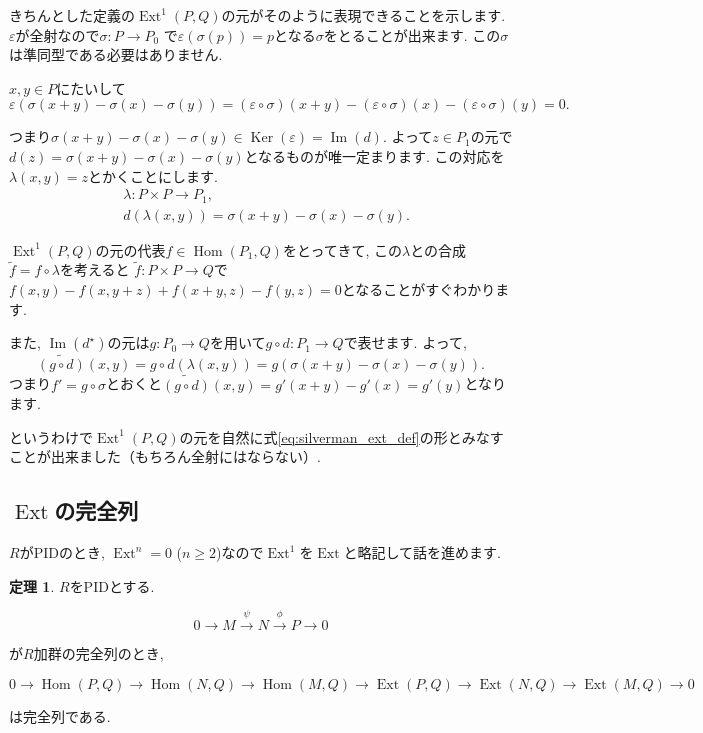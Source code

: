 \documentclass{jsarticle}
\newcommand{\makeop}[1]{\mathop{\mathrm{#1}}\nolimits}
\def\Im{\makeop{Im}}
\def\Ker{\makeop{Ker}}
\def\Hom{\makeop{Hom}}
\def\Ext{\makeop{Ext}}
\theoremstyle{definition}
\newtheorem{theorem}{定理}
\numberwithin{theorem}{section}
\begin{document}
きちんとした定義の$\Ext^1(P, Q)$の元がそのように表現できることを示します. $\varepsilon$が全射なので$\sigma : P \rightarrow P_0$
で$\varepsilon(\sigma(p)) = p$となる$\sigma$をとることが出来ます. この$\sigma$は準同型である必要はありません.

$x, y \in P$にたいして
\[
\varepsilon(\sigma(x+y) - \sigma(x) - \sigma(y)) = (\varepsilon\circ\sigma)(x+y) - (\varepsilon\circ\sigma)(x) - (\varepsilon\circ\sigma)(y) = 0.
\]

つまり$\sigma(x+y) - \sigma(x) - \sigma(y) \in \Ker(\varepsilon) = \Im(d)$. よって$z\in P_1$の元で
$d(z) = \sigma(x+y) - \sigma(x) - \sigma(y)$となるものが唯一定まります. この対応を$\lambda(x, y) = z$とかくことにします.
\begin{align*}
& \lambda: P\times P \rightarrow P_1,\\
& d(\lambda(x, y)) = \sigma(x+y) - \sigma(x) - \sigma(y).
\end{align*}

$\Ext^1(P, Q)$の元の代表$f\in\Hom(P_1, Q)$をとってきて, この$\lambda$との合成$\tilde{f} = f\circ\lambda$を考えると
$\tilde{f} : P \times P \rightarrow Q$で$f(x, y) - f(x, y+z) + f(x+y, z) - f(y, z) = 0$となることがすぐわかります.

また, $\Im(d^\star)$の元は$g: P_0 \rightarrow Q$を用いて$g\circ d: P_1 \rightarrow Q$で表せます. よって,
\[
\widetilde{(g\circ d)} (x, y) = g\circ d(\lambda(x, y)) = g(\sigma(x+y) - \sigma(x) - \sigma(y)).
\]
つまり$f' = g\circ\sigma$とおくと$\widetilde{(g\circ d)}(x, y) = g'(x+y) - g'(x) = g'(y)$となります.

というわけで$\Ext^1(P, Q)$の元を自然に式\ref{eq:silverman_ext_def}の形とみなすことが出来ました（もちろん全射にはならない）.

\subsection{$\Ext$の完全列}
$R$がPIDのとき, $\Ext^n = 0$ ($n \geq 2$)なので$\Ext^1$を$\Ext$と略記して話を進めます.

\begin{theorem}
$R$をPIDとする.

\begin{equation*}
0 \rightarrow M \xrightarrow{\psi} N \xrightarrow{\phi} P \rightarrow 0
\end{equation*}

が$R$加群の完全列のとき,

\begin{equation*}
0 \rightarrow \Hom(P, Q) \rightarrow \Hom(N, Q) \rightarrow \Hom(M, Q) \rightarrow
\Ext(P, Q) \rightarrow \Ext(N, Q) \rightarrow \Ext(M, Q) \rightarrow 0
\end{equation*}

は完全列である.
\end{theorem}
\end{document}
